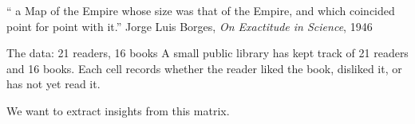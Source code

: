 
\AINITactone%
  {``\textellipsis{} a Map of the Empire whose size was that of the Empire, and which coincided point for point with it.''}%
  {Jorge Luis Borges, \textit{On Exactitude in Science}, 1946}

\begin{frame}{The data: 21 readers, 16 books}
  A small public library has kept track of 21 readers and 16 books.
  Each cell records whether the reader liked the book, disliked it,
  or has not yet read it.

  \vspace{0.5em}

  We want to extract insights from this matrix.
\end{frame}

